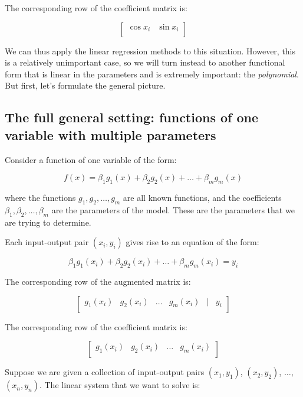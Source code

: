 \documentclass[10pt]{amsart}
\begin{document}
The corresponding row of the coefficient matrix is:

$$\left[\begin{matrix} \cos x_i & \sin x_i \\\end{matrix}\right]$$

We can thus apply the linear regression methods to this
situation. However, this is a relatively unimportant case, so we will
turn instead to another functional form that is linear in the
parameters and is extremely important: the {\em polynomial}. But
first, let's formulate the general picture.

\subsection{The full general setting: functions of one variable with multiple parameters}

Consider a function of one variable of the form:

$$f(x) = \beta_1g_1(x) + \beta_2g_2(x) + \dots + \beta_mg_m(x)$$

where the functions $g_1,g_2,\dots,g_m$ are all known functions, and
the coefficients $\beta_1,\beta_2,\dots,\beta_m$ are the parameters of the
model. These are the parameters that we are trying to determine.

Each input-output pair $(x_i,y_i)$ gives rise to an equation of the
form:

$$\beta_1g_1(x_i) + \beta_2g_2(x_i) + \dots + \beta_mg_m(x_i) = y_i$$

The corresponding row of the augmented matrix is:

$$\left[ \begin{matrix} g_1(x_i) & g_2(x_i) & \dots & g_m(x_i) & \mid & y_i \\\end{matrix} \right]$$

The corresponding row of the coefficient matrix is:

$$\left[ \begin{matrix} g_1(x_i) & g_2(x_i) & \dots & g_m(x_i) \\\end{matrix}\right]$$

Suppose we are given a collection of input-output pairs $(x_1,y_1)$,
$(x_2,y_2)$, $\dots$, $(x_n,y_n)$. The linear system that we want to
solve is:
\end{document}
